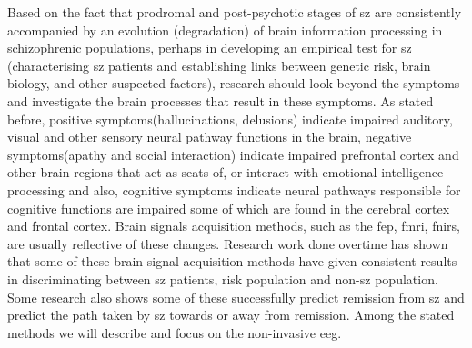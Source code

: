 Based on the fact that prodromal and post-psychotic stages of \ac{sz} are consistently accompanied by an evolution (degradation) of brain information processing in schizophrenic populations, perhaps in developing an empirical test for \ac{sz} (characterising \ac{sz} patients and establishing links between genetic risk, brain biology, and other suspected factors), research should look beyond the symptoms and investigate the brain processes that result in these symptoms. As stated before, positive symptoms(hallucinations, delusions) indicate impaired auditory, visual and other sensory neural pathway functions in the brain, negative symptoms(apathy and social interaction) indicate impaired prefrontal cortex and other brain regions that act as seats of, or interact with emotional intelligence processing and also, cognitive symptoms indicate neural pathways responsible for cognitive functions are impaired some of which are found in the cerebral cortex and frontal cortex. Brain signals acquisition methods, such as the \ac{fep}, \ac{fmri}, \ac{fnirs}, are usually reflective of these changes. Research work done overtime has shown that some of these brain signal acquisition methods have given consistent results in discriminating between \ac{sz} patients, risk population and  non-\ac{sz} population. Some research also shows some of these successfully predict remission from \ac{sz} and predict the path taken by \ac{sz} towards or away from remission. Among the stated methods we will describe and focus on the non-invasive \ac{eeg}.
